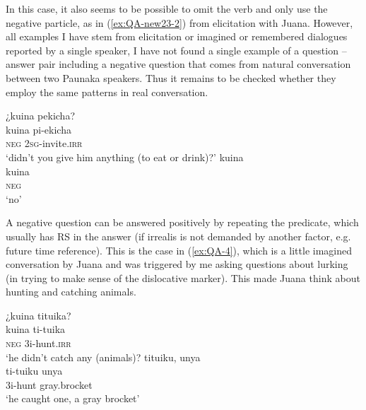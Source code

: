 In this case, it also seems to be possible to omit the verb and only use the negative particle, as in (\ref{ex:QA-new23-2}) from elicitation with Juana. However, all examples I have stem from elicitation or imagined or remembered dialogues reported by a single speaker, I have not found a single example of a question – answer pair including a negative question that comes from natural conversation between two Paunaka speakers. Thus it remains to be checked whether they employ the same patterns in real conversation.

\ea\label{ex:QA-new23-2}
  \ea
\begingl
\glpreamble ¿kuina pekicha?\\
\gla kuina pi-ekicha\\
\glb \textsc{neg} 2\textsc{sg}-invite.\textsc{irr} \\
\glft ‘didn’t you give him anything (to eat or drink)?'
\endgl
  \ex
\begingl
\glpreamble kuina\\
\gla kuina\\
\glb \textsc{neg}\\
\glft ‘no’
\endgl
\trailingcitation{[jmx-e090727s.179]}
\z
\xe
{}

A negative question can be answered positively by repeating the predicate, which usually has  RS in the answer (if irrealis is not demanded by another factor, e.g. future time reference). This is the case in (\ref{ex:QA-4}), which is a little imagined conversation by  Juana and was triggered by me asking questions about lurking (in trying to make sense of the dislocative marker). This made Juana think about hunting and catching animals.

\ea\label{ex:QA-4}
  \ea
\begingl
\glpreamble ¿kuina tituika? \\
\gla kuina ti-tuika\\
\glb \textsc{neg} 3i-hunt.\textsc{irr}\\
\glft ‘he didn’t catch any (animals)?
\endgl
  \ex
\begingl
\glpreamble tituiku, unya\\
\gla ti-tuiku unya\\
\glb 3i-hunt gray.brocket\\
\glft ‘he caught one, a gray brocket’
\endgl
\trailingcitation{[jxx-e110923l-1.059-060]}
\z
\xe
{}

%
%
%
%
%
%
%
%
%


